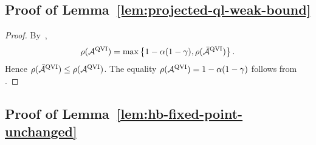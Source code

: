 \documentclass[letterpaper]{article}
\numberwithin{equation}{section}
\begin{document}
\subsection{Proof of Lemma~\ref{lem:projected-ql-weak-bound}}
\label{app:proof-lem-projected-ql-weak-bound}

\begin{proof}
By~,
\begin{align*}
  \rho(\mathcal A^{\rm QVI})
  =\max\left\{1-\alpha(1-\gamma),\rho(\bar{\mathcal A}^{\rm QVI})\right\}.
\end{align*}
Hence $\rho(\bar{\mathcal A}^{\rm QVI})\le\rho(\mathcal A^{\rm QVI})$.
The equality
$\rho(\mathcal A^{\rm QVI})=1-\alpha(1-\gamma)$ follows from
.
\end{proof}

\subsection{Proof of Lemma~\ref{lem:hb-fixed-point-unchanged}}
\label{app:proof-lem-hb-fixed-point-unchanged}
\end{document}
